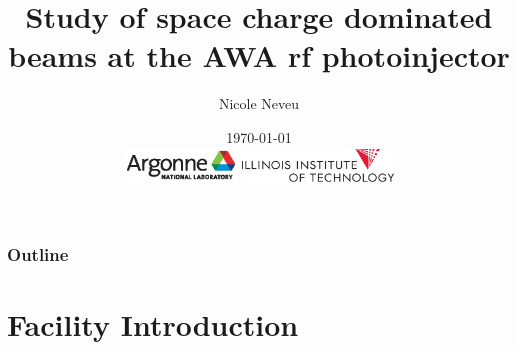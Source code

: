 \documentclass[professionalfonts,t]{beamer}
\title[Space Charge 2017]{Study of space charge dominated beams at the AWA rf photoinjector}
\author[N.Neveu]{{\Large Nicole Neveu}}
\institute[ANL, IIT] %
{   Illinois Institute of Technology \\
	Argonne National Laboratory \\
    \url{nneveu@anl.gov} 
}
\date{ \today \\
\includegraphics[width=3cm,keepaspectratio]{../images/Argonne_cmyk_black}%
\hfill \hfill \hfill%
\includegraphics[width=4cm,keepaspectratio]{../images/IIT_logo}%
}
\begin{document}
\begin{frame}
  \titlepage
\end{frame}
\begin{frame}
	\frametitle{Outline}
	\tableofcontents
\end{frame}






\section{Facility Introduction}
\end{document}
